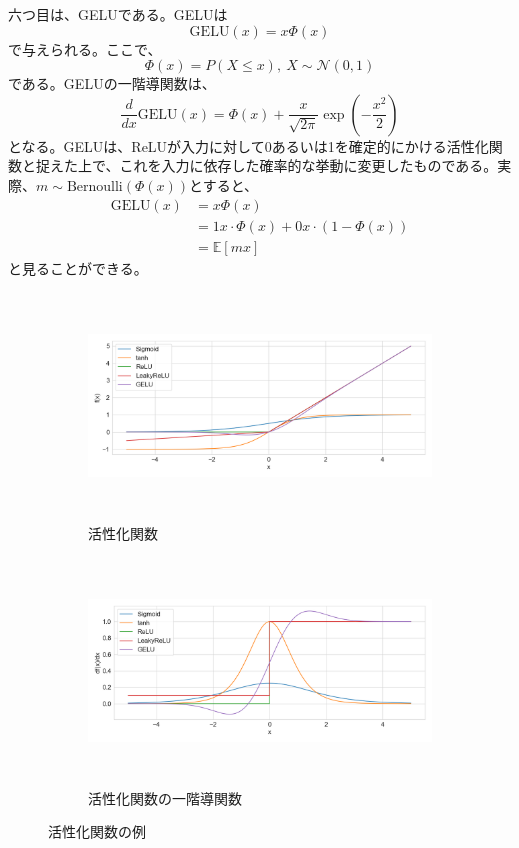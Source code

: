 \documentclass[12pt]{jarticle}
\numberwithin{equation}{section}    %
\numberwithin{figure}{section}      %
\numberwithin{table}{section}      %
\begin{document}
六つ目は、GELU\cite{hendrycks2016gaussian}である。GELUは
\begin{equation}
    \text{GELU}(x) = x \Phi(x)
\end{equation}
で与えられる。ここで、
\begin{equation}
    \Phi(x) = P(X \le x), ~ X \sim \mathcal{N} (0, 1)
\end{equation}
である。GELUの一階導関数は、
\begin{equation}
    \frac{d}{dx}\text{GELU}(x) = \Phi(x) + \frac{x}{\sqrt{2\pi}}\exp(-\frac{x^{2}}{2})
\end{equation}
となる。GELUは、ReLUが入力に対して0あるいは1を確定的にかける活性化関数と捉えた上で、これを入力に依存した確率的な挙動に変更したものである。実際、$m \sim \text{Bernoulli}(\Phi(x))$とすると、
\begin{align}
    \text{GELU}(x) & = x \Phi(x)                                   \\
                   & = 1 x \cdot \Phi(x) + 0 x \cdot (1 - \Phi(x)) \\
                   & = \mathbb{E} [mx]
\end{align}
と見ることができる。

\begin{figure}[tb]
    \centering
    \begin{subfigure}[b]{1.0\textwidth}
        \centering
        \includegraphics[height=6cm]{./figure/sec3/activations.png}
        \caption{活性化関数}
        \label{sec3:fig:activations}
    \end{subfigure}
    \begin{subfigure}[b]{1.0\textwidth}
        \centering
        \includegraphics[height=6cm]{./figure/sec3/activations_prime.png}
        \caption{活性化関数の一階導関数}
        \label{sec3:fig:activations_prime}
    \end{subfigure}
    \caption{活性化関数の例}
    \label{sec3:fig:activations_and_their_prime}
\end{figure}
\end{document}
